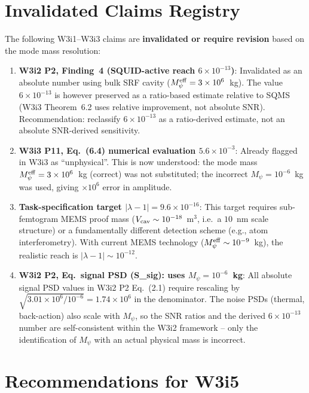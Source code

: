 \documentclass[11pt,twocolumn]{article}
\newcommand{\lam}{\lambda}
\newcommand{\Mpsi}{M_\psi}
\newcommand{\Meff}{M_\psi^{\rm eff}}
\newcommand{\ee}[1]{\times 10^{#1}}
\newcommand{\Vcav}{V_{\rm cav}}
\begin{document}
\section{Invalidated Claims Registry}
\label{sec:invalidated}

The following W3i1--W3i3 claims are \textbf{invalidated or require revision}
based on the mode mass resolution:

\begin{enumerate}
\item \textbf{W3i2 P2, Finding~4 (SQUID-active reach $6\ee{-13}$)}: Invalidated
  as an absolute number using bulk SRF cavity ($\Meff = 3\ee{6}$~kg). The
  value $6\ee{-13}$ is however preserved as a ratio-based estimate relative
  to SQMS (W3i3 Theorem~6.2 uses relative improvement, not absolute SNR).
  Recommendation: reclassify $6\ee{-13}$ as a ratio-derived estimate,
  not an absolute SNR-derived sensitivity.

\item \textbf{W3i3 P11, Eq.~(6.4) numerical evaluation $5.6\ee{-3}$}: Already
  flagged in W3i3 as ``unphysical''. This is now understood: the mode mass
  $\Meff = 3\ee{6}$~kg (correct) was not substituted; the incorrect
  $\Mpsi = 10^{-6}$~kg was used, giving $\times 10^6$ error in amplitude.

\item \textbf{Task-specification target $|\lam-1| = 9.6\ee{-16}$}: This target
  requires sub-femtogram MEMS proof mass ($\Vcav \sim 10^{-18}$~m$^3$,
  i.e.~a $10$~nm scale structure) or a fundamentally different detection
  scheme (e.g., atom interferometry). With current MEMS technology
  ($\Meff \sim 10^{-9}$~kg), the realistic reach is $|\lam-1|\sim 10^{-12}$.

\item \textbf{W3i2 P2, Eq.~signal PSD (S\_sig): uses $\Mpsi = 10^{-6}$~kg}:
  All absolute signal PSD values in W3i2 P2 Eq.~(2.1) require rescaling
  by $\sqrt{3.01\ee{6}/10^{-6}} = 1.74\ee{6}$ in the denominator.
  The noise PSDs (thermal, back-action) also scale with $\Mpsi$, so
  the SNR ratios and the derived $6\ee{-13}$ number are self-consistent
  within the W3i2 framework -- only the identification of $\Mpsi$ with
  an actual physical mass is incorrect.
\end{enumerate}

\section{Recommendations for W3i5}
\label{sec:recommendations}
\end{document}
